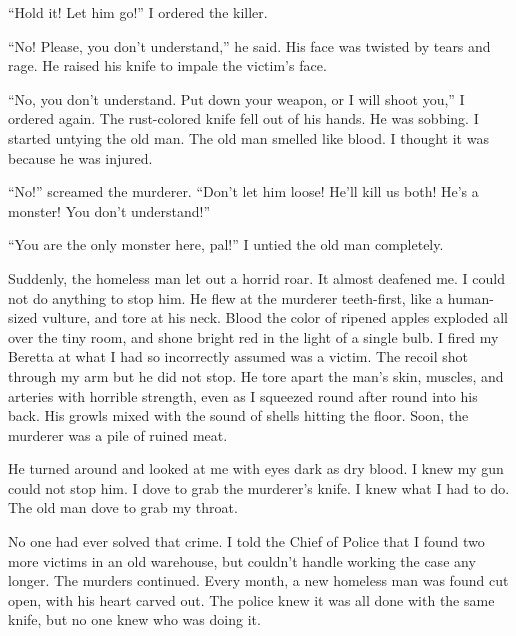 ``Hold it! Let him go!'' I ordered the killer.



``No! Please, you don't understand,'' he said. His
face was twisted by tears and rage. He raised his knife to impale
the victim's face.



``No, you don't understand. Put down your weapon, or I
will shoot you,'' I ordered again. The rust-colored knife fell
out of his hands. He was sobbing. I started untying the old man.
The old man smelled like blood. I thought it was because he was
injured.



``No!'' screamed the murderer. ``Don't let him
loose! He'll kill us both! He's a monster! You
don't understand!''



``You are the only monster here, pal!'' I untied the old
man completely.



Suddenly, the homeless man let out a horrid roar. It almost
deafened me. I could not do anything to stop him. He flew at the
murderer teeth-first, like a human-sized vulture, and tore at his
neck. Blood the color of ripened apples exploded all over the tiny
room, and shone bright red in the light of a single bulb. I fired
my Beretta at what I had so incorrectly assumed was a victim. The
recoil shot through my arm but he did not stop. He tore apart the
man's skin, muscles, and arteries with horrible strength,
even as I squeezed round after round into his back. His growls
mixed with the sound of shells hitting the floor. Soon, the
murderer was a pile of ruined meat.



He turned around and looked at me with eyes dark as dry blood. I
knew my gun could not stop him. I dove to grab the murderer's
knife. I knew what I had to do. The old man dove to grab my
throat.



No one had ever solved that crime. I told the Chief of Police that
I found two more victims in an old warehouse, but couldn't
handle working the case any longer. The murders continued. Every
month, a new homeless man was found cut open, with his heart carved
out. The police knew it was all done with the same knife, but no
one knew who was doing it. 
 




